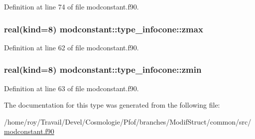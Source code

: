 Definition at line 74 of file modconstant.\-f90.

\hypertarget{structmodconstant_1_1type__infocone_a77285fcf1f97a7e6a64b020abafdf88c}{
\subsubsection[{zmax}]{\setlength{\rightskip}{0pt plus 5cm}real(kind=8) modconstant\-::type\-\_\-infocone\-::zmax}}\label{structmodconstant_1_1type__infocone_a77285fcf1f97a7e6a64b020abafdf88c}


Definition at line 62 of file modconstant.\-f90.

\hypertarget{structmodconstant_1_1type__infocone_a13b7f6b5ba231ea18c19aea9b93f0016}{
\subsubsection[{zmin}]{\setlength{\rightskip}{0pt plus 5cm}real(kind=8) modconstant\-::type\-\_\-infocone\-::zmin}}\label{structmodconstant_1_1type__infocone_a13b7f6b5ba231ea18c19aea9b93f0016}


Definition at line 63 of file modconstant.\-f90.



The documentation for this type was generated from the following file\-:\begin{DoxyCompactItemize}
\item 
/home/roy/\-Travail/\-Devel/\-Cosmologie/\-Pfof/branches/\-Modif\-Struct/common/src/\hyperlink{modconstant_8f90}{modconstant.\-f90}\end{DoxyCompactItemize}
